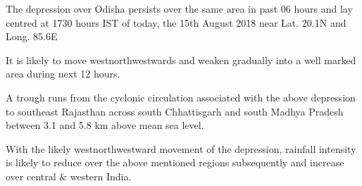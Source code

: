 \item  The depression over Odisha persists over the same area in past 06 hours and lay centred at 1730 hours IST of today, the 15th August 2018 near Lat. 20.1N and Long. 85.6E
\item It is likely to move west­northwestwards and weaken gradually
into a well marked area during next 12 hours.
\item A trough runs from the cyclonic circulation associated with the above depression to southeast Rajasthan across south Chhattisgarh and south Madhya Pradesh between 3.1 and 5.8 km above mean sea level.
\item With the likely west­northwestward movement of the depression, rainfall intensity is likely to reduce over the above mentioned regions subsequently and increase over central \& western India.
